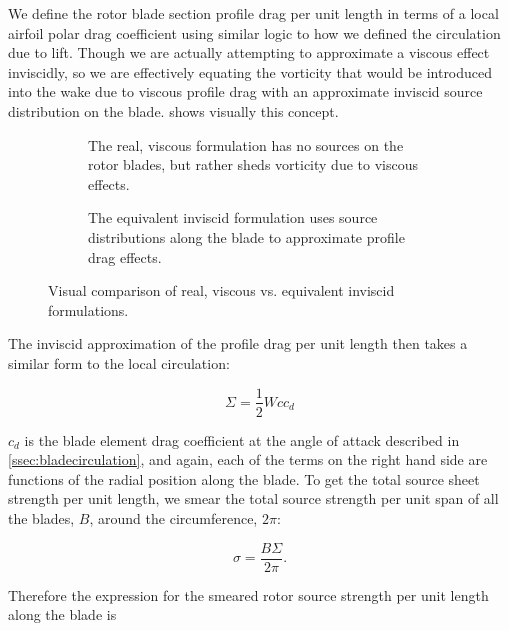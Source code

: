 We define the rotor blade section profile drag per unit length in terms of a local airfoil polar drag coefficient using similar logic to how we defined the circulation due to lift.
%
Though we are actually attempting to approximate a viscous effect inviscidly, so we are effectively equating the vorticity that would be introduced into the wake due to viscous profile drag with an approximate inviscid source distribution on the blade.
%
 shows visually this concept.
%
\begin{figure}[h!]
     \centering
     \begin{subfigure}[t]{0.45\textwidth}
        \centering
        
        \caption{The real, viscous formulation has no sources on the rotor blades, but rather sheds vorticity due to viscous effects.}
        \label{}
     \end{subfigure}
     \hfill
     \begin{subfigure}[t]{0.45\textwidth}
         \centering
        
        \caption{The equivalent inviscid formulation uses source distributions along the blade to approximate profile drag effects.}
        \label{}
     \end{subfigure}
     \caption{Visual comparison of real, viscous vs. equivalent inviscid formulations.}
    \label{fig:rvf_eif}
\end{figure}
%
The inviscid approximation of the profile drag per unit length then takes a similar form to the local circulation:

\begin{equation}
     \Sigma = \frac{1}{2} W c c_d
\end{equation}

\where \(c_d\) is the blade element drag coefficient at the angle of attack described in \cref{ssec:bladecirculation}, and again, each of the terms on the right hand side are functions of the radial position along the blade.
%
To get the total source sheet strength per unit length, we smear the total source strength per unit span of all the blades, \(B\), around the circumference, \(2\pi \):

\begin{equation}
    \sigma = \frac{B \Sigma}{2 \pi}.
\end{equation}

Therefore the expression for the smeared rotor source strength per unit length along the blade is

